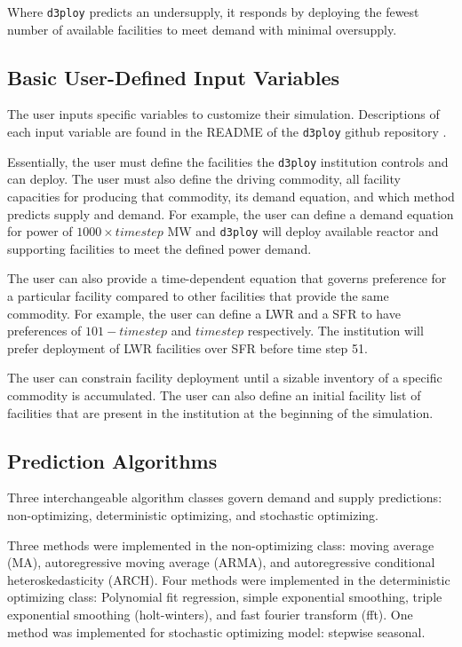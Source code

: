 \documentclass{anstrans}
\newcommand{\deploy}{\texttt{d3ploy}\xspace}%
\begin{document}
Where \deploy predicts an undersupply, it responds by deploying 
the fewest number of available facilities to meet demand with minimal 
oversupply.  

\subsection{\textbf{Basic User-Defined Input Variables}}
The user inputs specific variables to customize their
simulation. 
Descriptions of each input variable are found in the 
README of the \deploy github repository \cite{d3ploy_doi_2019}.

Essentially, the user must define the facilities the 
\deploy institution controls and can deploy. 
The user must also define the driving commodity, all facility capacities 
for producing that commodity, its demand 
equation, and which method predicts supply and demand. 
For example, the user can define a demand equation for power of 
$1000 \times timestep$ MW and \deploy will deploy available reactor and supporting 
facilities to meet the defined power demand. 

The user can also provide a time-dependent equation that governs
preference for a particular facility compared to other facilities that 
provide the same commodity. 
For example, the user can define a \gls{LWR} and a \gls{SFR} to have
preferences of $101 - timestep$ and $timestep$ respectively. 
The institution will prefer deployment of \gls{LWR} facilities over 
\gls{SFR} before time step 51. 

The user can constrain facility deployment 
until a sizable inventory of a specific commodity is accumulated.  
The user can also define an initial facility list of facilities that 
are present in the institution at the beginning of the simulation. 

\subsection{\textbf{Prediction Algorithms}}
Three interchangeable algorithm classes govern demand and supply 
predictions: non-optimizing, deterministic optimizing, and stochastic
optimizing. 

Three methods were implemented in the non-optimizing class: 
moving average (MA),
autoregressive moving average (ARMA), and autoregressive 
conditional heteroskedasticity (ARCH).
Four methods were implemented in the deterministic optimizing class: 
Polynomial fit regression, simple exponential smoothing,  
triple exponential smoothing (holt-winters), and fast fourier 
transform (fft). 
One method was implemented for stochastic optimizing model: 
stepwise seasonal.  
\end{document}
